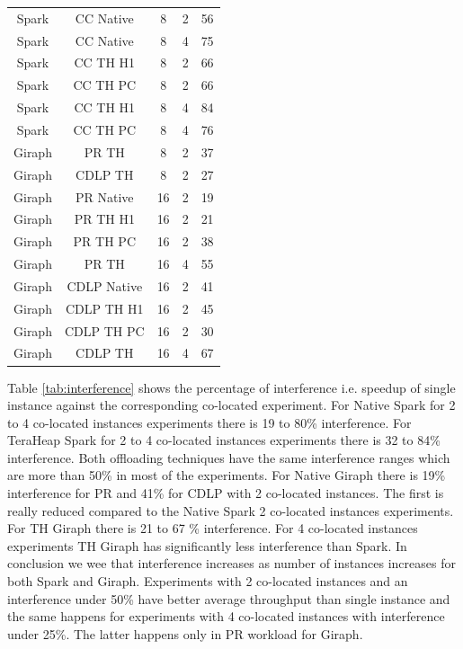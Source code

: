 \begin{table}[thbp]
\begin{tabular}{|c|c|c|c|c|}
          Spark & CC Native & 8 & 2 & 56 \\
          Spark & CC Native & 8 & 4 & 75 \\
          Spark & CC TH H1 & 8 & 2 & 66 \\
          Spark & CC TH PC & 8 & 2 & 66 \\
          Spark & CC TH H1 & 8 & 4 & 84  \\
          Spark & CC TH PC & 8 & 4 & 76 \\
	  Giraph & PR TH & 8 & 2 & 37 \\
	  Giraph & CDLP TH & 8 & 2 & 27 \\
          Giraph & PR Native & 16 & 2 & 19 \\
          Giraph & PR TH H1 & 16 & 2 & 21 \\
          Giraph & PR TH PC & 16 & 2 & 38 \\
          Giraph & PR TH & 16 & 4 & 55 \\
          Giraph & CDLP Native & 16 & 2 & 41 \\
          Giraph & CDLP TH H1 & 16 & 2 & 45 \\
          Giraph & CDLP TH PC & 16 & 2 & 30 \\
          Giraph & CDLP TH & 16 & 4 & 67 \\
    \hline
  \end{tabular}
\end{table}


Table \ref{tab:interference} shows the percentage of interference i.e. speedup of single instance against the corresponding co-located experiment. For Native Spark for 2 to 4 co-located instances experiments there is 19 to 80\% interference. For TeraHeap Spark for 2 to 4 co-located instances experiments there is 32 to 84\% interference. Both offloading techniques have the same interference ranges which are more than 50\% in most of the experiments. For Native Giraph there is 19\% interference for PR and 41\% for CDLP with 2 co-located instances. The first is really reduced compared to the Native Spark 2 co-located instances experiments. For TH Giraph there is 21 to 67 \% interference. For 4 co-located instances experiments TH Giraph has significantly less interference than Spark. In conclusion we wee that interference increases as number of instances increases for both Spark and Giraph. Experiments with 2 co-located instances and an interference under 50\% have better average throughput than single instance and the same happens for experiments with 4 co-located instances with interference under 25\%. The latter happens
only in PR workload for Giraph.

